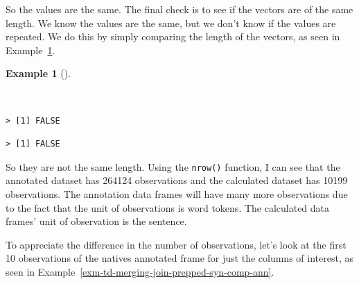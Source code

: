 \documentclass[
  letterpaper,
  DIV=11,
  numbers=noendperiod]{scrreport}
\newenvironment{Shaded}{\begin{snugshade}}{\end{snugshade}}
\newcommand{\CommentTok}[1]{\textcolor[rgb]{0.00,0.00,0.00}{\textit{#1}}}
\newcommand{\FunctionTok}[1]{\textcolor[rgb]{0.00,0.00,0.00}{#1}}
\newcommand{\NormalTok}[1]{\textcolor[rgb]{0.00,0.00,0.00}{#1}}
\newcommand{\SpecialCharTok}[1]{\textcolor[rgb]{0.00,0.00,0.00}{#1}}
\theoremstyle{definition}
\newtheorem{example}{Example}[chapter]
\theoremstyle{remark}
\begin{document}
So the values are the same. The final check is to see if the vectors are
of the same length. We know the values are the same, but we don't know
if the values are repeated. We do this by simply comparing the length of
the vectors, as seen in
Example~\ref{exm-td-merging-join-prepped-syn-comp-length}.

\begin{example}[]\protect\hypertarget{exm-td-merging-join-prepped-syn-comp-length}{}\label{exm-td-merging-join-prepped-syn-comp-length}

~

\begin{Shaded}
\end{Shaded}

\begin{verbatim}
> [1] FALSE
\end{verbatim}

\begin{Shaded}
\end{Shaded}

\begin{verbatim}
> [1] FALSE
\end{verbatim}

\end{example}

So they are not the same length. Using the \texttt{nrow()} function, I
can see that the annotated dataset has 264124 observations and the
calculated dataset has 10199 observations. The annotation data frames
will have many more observations due to the fact that the unit of
observations is word tokens. The calculated data frames' unit of
observation is the sentence.

To appreciate the difference in the number of observations, let's look
at the first 10 observations of the natives annotated frame for just the
columns of interest, as seen in
Example~\ref{exm-td-merging-join-prepped-syn-comp-ann}.
\end{document}
